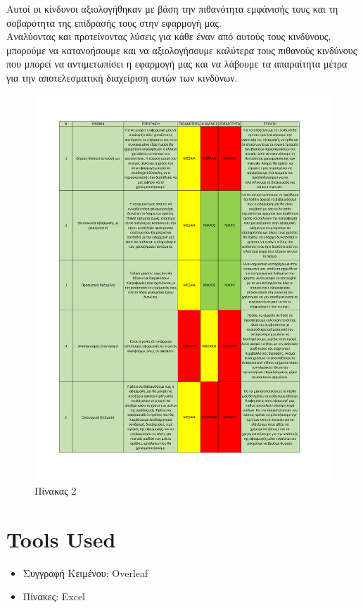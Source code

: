 \documentclass[11pt]{scrartcl} %
\begin{document}
Αυτοί οι κίνδυνοι αξιολογήθηκαν με βάση την πιθανότητα εμφάνισής τους και τη σοβαρότητα της επίδρασής τους στην εφαρμογή μας. \\

Αναλύοντας και προτείνοντας λύσεις για κάθε έναν από αυτούς τους κινδύνους, μπορούμε να κατανοήσουμε και να αξιολογήσουμε καλύτερα τους πιθανούς κινδύνους που μπορεί να αντιμετωπίσει η εφαρμογή μας και να λάβουμε τα απαραίτητα μέτρα για την αποτελεσματική διαχείριση αυτών των κινδύνων. \\

\begin{figure}
    \hspace{-3.3cm}
    \includegraphics[trim = 0cm 2cm 0cm 1.8cm, clip]{assets/table_2.pdf}
    \caption{Πίνακας 2}
\end{figure}
\pagebreak

\section*{Tools Used}
\begin{itemize}
    \item Συγγραφή Κειμένου: Overleaf
    \item Πίνακες: Excel
\end{itemize}
\end{document}

